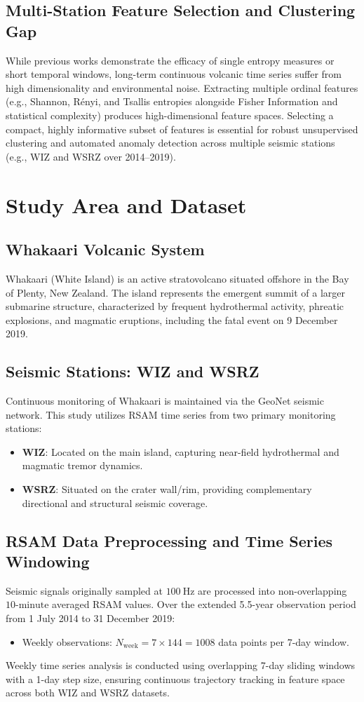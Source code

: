 \documentclass[journal]{IEEEtran}
\begin{document}
\subsection{Multi-Station Feature Selection and Clustering Gap}
While previous works demonstrate the efficacy of single entropy measures or short temporal windows, long-term continuous volcanic time series suffer from high dimensionality and environmental noise. Extracting multiple ordinal features (e.g., Shannon, Rényi, and Tsallis entropies alongside Fisher Information and statistical complexity) produces high-dimensional feature spaces. Selecting a compact, highly informative subset of features is essential for robust unsupervised clustering and automated anomaly detection across multiple seismic stations (e.g., WIZ and WSRZ over 2014--2019).

\section{Study Area and Dataset}
\subsection{Whakaari Volcanic System}
Whakaari (White Island) is an active stratovolcano situated offshore in the Bay of Plenty, New Zealand. The island represents the emergent summit of a larger submarine structure, characterized by frequent hydrothermal activity, phreatic explosions, and magmatic eruptions, including the fatal event on 9 December 2019.

\subsection{Seismic Stations: WIZ and WSRZ}
Continuous monitoring of Whakaari is maintained via the GeoNet seismic network. This study utilizes RSAM time series from two primary monitoring stations:
\begin{itemize}
    \item \textbf{WIZ}: Located on the main island, capturing near-field hydrothermal and magmatic tremor dynamics.
    \item \textbf{WSRZ}: Situated on the crater wall/rim, providing complementary directional and structural seismic coverage.
\end{itemize}

\subsection{RSAM Data Preprocessing and Time Series Windowing}
Seismic signals originally sampled at $100~\text{Hz}$ are processed into non-overlapping $10\text{-minute}$ averaged RSAM values. Over the extended 5.5-year observation period from 1 July 2014 to 31 December 2019:
\begin{itemize}
    \item Weekly observations: $N_{\text{week}} = 7 \times 144 = 1008$ data points per 7-day window.
\end{itemize}
Weekly time series analysis is conducted using overlapping 7-day sliding windows with a 1-day step size, ensuring continuous trajectory tracking in feature space across both WIZ and WSRZ datasets.
\end{document}

